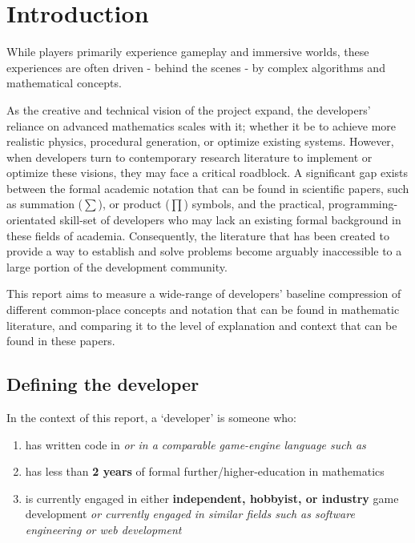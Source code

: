 \chapter{Introduction}

While players primarily experience gameplay and immersive worlds, these experiences are often driven - behind the scenes - by complex algorithms and mathematical concepts.

As the creative and technical vision of the project expand, the developers' reliance on advanced mathematics scales with it; whether it be to achieve more realistic physics,
procedural generation, or optimize existing systems.
However, when developers turn to contemporary research literature to implement or optimize these visions, they may face a critical roadblock.
A significant gap exists between the formal academic notation that can be found in scientific papers, such as summation ($\sum$), or product ($\prod$) symbols,
and the practical, programming-orientated skill-set of developers who may lack an existing formal background in these fields of academia.
Consequently, the literature that has been created to provide a way to establish and solve problems become arguably inaccessible to a large portion of the development community.

This report aims to measure a wide-range of developers' baseline compression of different common-place concepts and notation that can be found in mathematic literature, and
comparing it to the level of explanation and context that can be found in these papers.

\section{Defining the developer}

In the context of this report, a `developer' is someone who:

\begin{enumerate}
    \item has written code in \CPP \textit{or in a comparable game-engine language such as} \CS
    \item has less than \textbf{2 years} of formal further/higher-education in mathematics
    \item is currently engaged in either \textbf{independent, hobbyist, or industry} game development \textit{or currently engaged in similar fields such as software engineering or web development}
\end{enumerate}

